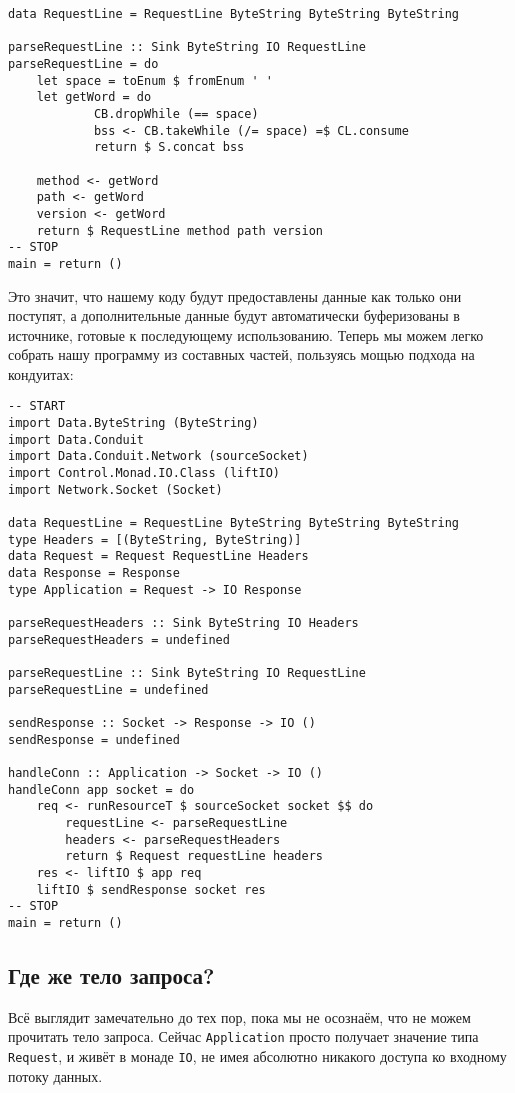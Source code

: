 {\begin{lstlisting}
data RequestLine = RequestLine ByteString ByteString ByteString

parseRequestLine :: Sink ByteString IO RequestLine
parseRequestLine = do
    let space = toEnum $ fromEnum ' '
    let getWord = do
            CB.dropWhile (== space)
            bss <- CB.takeWhile (/= space) =$ CL.consume
            return $ S.concat bss

    method <- getWord
    path <- getWord
    version <- getWord
    return $ RequestLine method path version
-- STOP
main = return ()
\end{lstlisting}
Это значит, что нашему коду будут предоставлены данные как только они поступят,
а дополнительные данные будут автоматически буферизованы в источнике, 
готовые к последующему использованию. Теперь мы можем легко собрать нашу программу 
из составных частей, пользуясь мощью подхода на кондуитах:
\begin{lstlisting}
-- START
import Data.ByteString (ByteString)
import Data.Conduit
import Data.Conduit.Network (sourceSocket)
import Control.Monad.IO.Class (liftIO)
import Network.Socket (Socket)

data RequestLine = RequestLine ByteString ByteString ByteString
type Headers = [(ByteString, ByteString)]
data Request = Request RequestLine Headers
data Response = Response
type Application = Request -> IO Response

parseRequestHeaders :: Sink ByteString IO Headers
parseRequestHeaders = undefined

parseRequestLine :: Sink ByteString IO RequestLine
parseRequestLine = undefined

sendResponse :: Socket -> Response -> IO ()
sendResponse = undefined

handleConn :: Application -> Socket -> IO ()
handleConn app socket = do
    req <- runResourceT $ sourceSocket socket $$ do
        requestLine <- parseRequestLine
        headers <- parseRequestHeaders
        return $ Request requestLine headers
    res <- liftIO $ app req
    liftIO $ sendResponse socket res
-- STOP
main = return ()
\end{lstlisting}
\subsection{Где же тело запроса?}
Всё выглядит замечательно до тех пор, пока мы не осознаём, что не можем прочитать тело запроса.
Сейчас
\lstinline{Application} просто получает значение типа \lstinline'Request', и живёт
в монаде \lstinline'IO', не имея абсолютно никакого 
доступа ко входному потоку данных.

}
